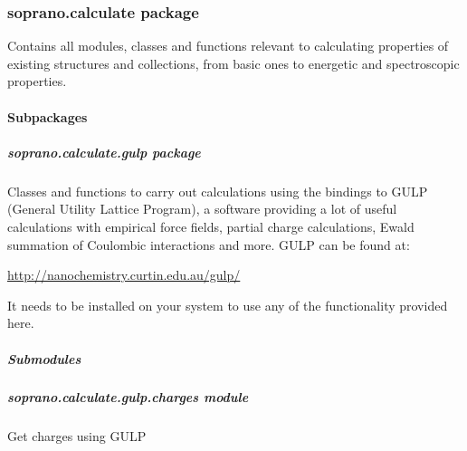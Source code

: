 \documentclass[letterpaper,10pt,english]{sphinxmanual}
\begin{document}
\subsubsection{soprano.calculate package}
\label{doctree/soprano.calculate:module-soprano.calculate}\label{doctree/soprano.calculate::doc}\label{doctree/soprano.calculate:soprano-calculate-package}
Contains all modules, classes and functions relevant
to calculating properties of existing structures and collections,
from basic ones to energetic and spectroscopic properties.


\paragraph{Subpackages}
\label{doctree/soprano.calculate:subpackages}

\subparagraph{soprano.calculate.gulp package}
\label{doctree/soprano.calculate.gulp:module-soprano.calculate.gulp}\label{doctree/soprano.calculate.gulp::doc}\label{doctree/soprano.calculate.gulp:soprano-calculate-gulp-package}
Classes and functions to carry out calculations using the bindings to GULP
(General Utility Lattice Program), a software providing a lot of useful
calculations with empirical force fields, partial charge calculations, Ewald
summation of Coulombic interactions and more. GULP can be found at:

\href{http://nanochemistry.curtin.edu.au/gulp/}{http://nanochemistry.curtin.edu.au/gulp/}

It needs to be installed on your system to use any of the functionality
provided here.


\subparagraph{Submodules}
\label{doctree/soprano.calculate.gulp:submodules}

\subparagraph{soprano.calculate.gulp.charges module}
\label{doctree/soprano.calculate.gulp.charges:soprano-calculate-gulp-charges-module}\label{doctree/soprano.calculate.gulp.charges:module-soprano.calculate.gulp.charges}\label{doctree/soprano.calculate.gulp.charges::doc}
Get charges using GULP
\end{document}
